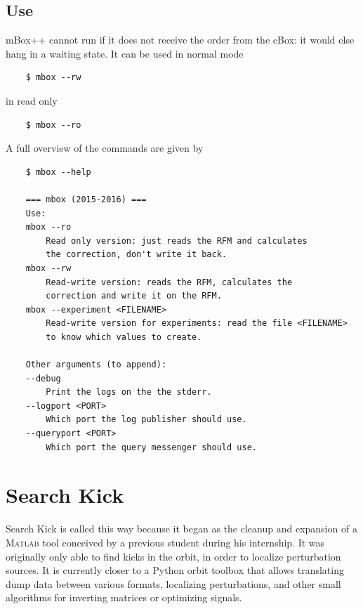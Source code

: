\section{Use}
mBox++ cannot run if it does not receive the order from the cBox: it would else hang in a waiting state.
It can be used in normal mode
\begin{verbatim}
    $ mbox --rw
\end{verbatim}
in read only
\begin{verbatim}
    $ mbox --ro
\end{verbatim}
A full overview of the commands are given by
\begin{verbatim}
    $ mbox --help

    === mbox (2015-2016) ===
    Use:
    mbox --ro
        Read only version: just reads the RFM and calculates
        the correction, don't write it back.
    mbox --rw
        Read-write version: reads the RFM, calculates the
        correction and write it on the RFM.
    mbox --experiment <FILENAME>
        Read-write version for experiments: read the file <FILENAME>
        to know which values to create.
    
    Other arguments (to append):
    --debug
        Print the logs on the the stderr.
    --logport <PORT>
        Which port the log publisher should use.
    --queryport <PORT>
        Which port the query messenger should use.
\end{verbatim}

\chapter{Search Kick}
Search Kick is called this way because it began as the cleanup and expansion of a \textsc{Matlab} tool conceived by a previous student during his internship. It was originally only able to find kicks in the orbit, in order to localize perturbation sources. It is currently closer to a Python orbit toolbox that allows translating dump data between various formats, localizing perturbations, and other small algorithms for inverting matrices or optimizing signals.


    